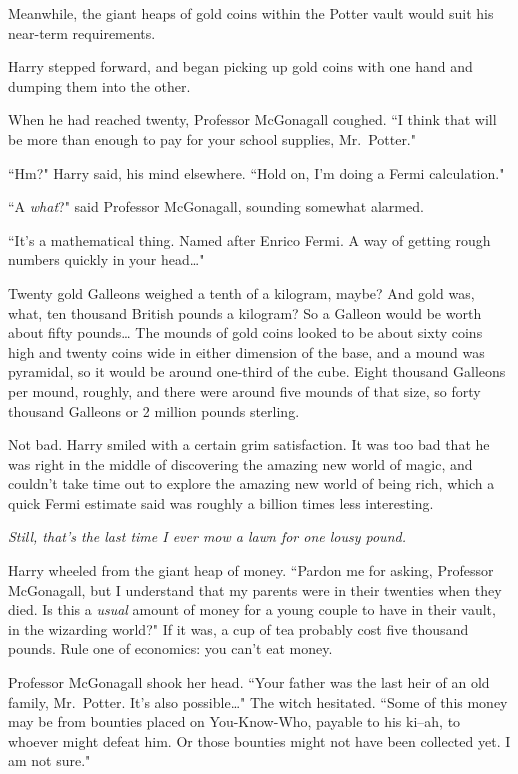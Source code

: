 Meanwhile, the giant heaps of gold coins within the Potter vault would suit his near-term requirements.

Harry stepped forward, and began picking up gold coins with one hand and dumping them into the other.

When he had reached twenty, Professor McGonagall coughed. ``I think that will be more than enough to pay for your school supplies, Mr.~Potter."

``Hm?" Harry said, his mind elsewhere. ``Hold on, I'm doing a Fermi calculation."

``A \emph{what}?" said Professor McGonagall, sounding somewhat alarmed.

``It's a mathematical thing. Named after Enrico Fermi. A way of getting rough numbers quickly in your head{\ldots}"

Twenty gold Galleons weighed a tenth of a kilogram, maybe? And gold was, what, ten thousand British pounds a kilogram? So a Galleon would be worth about fifty pounds{\ldots} The mounds of gold coins looked to be about sixty coins high and twenty coins wide in either dimension of the base, and a mound was pyramidal, so it would be around one-third of the cube. Eight thousand Galleons per mound, roughly, and there were around five mounds of that size, so forty thousand Galleons or 2 million pounds sterling.

Not bad. Harry smiled with a certain grim satisfaction. It was too bad that he was right in the middle of discovering the amazing new world of magic, and couldn't take time out to explore the amazing new world of being rich, which a quick Fermi estimate said was roughly a billion times less interesting.

\emph{Still, that's the last time I ever mow a lawn for one lousy pound.}

Harry wheeled from the giant heap of money. ``Pardon me for asking, Professor McGonagall, but I understand that my parents were in their twenties when they died. Is this a \emph{usual} amount of money for a young couple to have in their vault, in the wizarding world?" If it was, a cup of tea probably cost five thousand pounds. Rule one of economics: you can't eat money.

Professor McGonagall shook her head. ``Your father was the last heir of an old family, Mr.~Potter. It's also possible{\ldots}" The witch hesitated. ``Some of this money may be from bounties placed on You-Know-Who, payable to his ki\---ah, to whoever might defeat him. Or those bounties might not have been collected yet. I am not sure."

